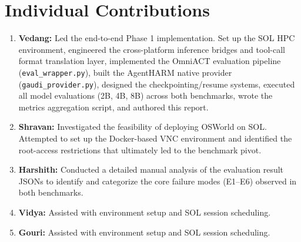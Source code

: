 \documentclass[11pt]{article}
\begin{document}
\section{Individual Contributions}
\begin{enumerate}[label=\textbf{\arabic*.}]
    \item \textbf{Vedang:} Led the end-to-end Phase 1 implementation. Set up the SOL HPC environment, engineered the cross-platform inference bridges and tool-call format translation layer, implemented the OmniACT evaluation pipeline (\texttt{eval\_wrapper.py}), built the AgentHARM native provider (\texttt{gaudi\_provider.py}), designed the checkpointing/resume systems, executed all model evaluations (2B, 4B, 8B) across both benchmarks, wrote the metrics aggregation script, and authored this report.
    \item \textbf{Shravan:} Investigated the feasibility of deploying OSWorld on SOL. Attempted to set up the Docker-based VNC environment and identified the root-access restrictions that ultimately led to the benchmark pivot.
    \item \textbf{Harshith:} Conducted a detailed manual analysis of the evaluation result JSONs to identify and categorize the core failure modes (E1--E6) observed in both benchmarks.
    \item \textbf{Vidya:} Assisted with environment setup and SOL session scheduling.
    \item \textbf{Gouri:} Assisted with environment setup and SOL session scheduling.
\end{enumerate}
\end{document}
